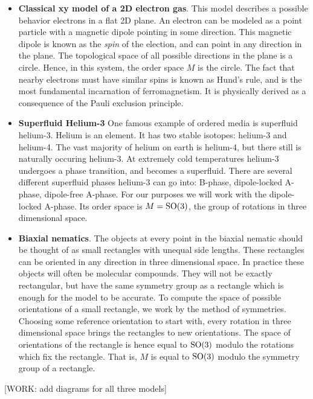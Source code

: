 \begin{itemize}
\item \textbf{Classical xy model of a 2D electron gas}. This model describes a possible behavior electrons in a flat 2D plane. An electron can be modeled as a point particle with a magnetic dipole pointing in some direction. This magnetic dipole is known as the \textit{spin} of the election, and can point in any direction in the plane. The topological space of all possible directions in the plane is a circle. Hence, in this system, the order space $M$ is the circle. The fact that nearby electrons must have similar spins is known as Hund’s rule, and is the most fundamental incarnation of ferromagnetism. It is physically derived as a consequence of the Pauli exclusion principle.

\item \textbf{Superfluid Helium-3} One famous example of ordered media is superfluid helium-3. Helium is an element. It has two stable isotopes: helium-3 and helium-4. The vast majority of helium on earth is helium-4, but there still is naturally occuring helium-3. At extremely cold temperatures helium-3 undergoes a phase transition, and becomes a superfluid. There are several different superfluid phases helium-3 can go into: B-phase, dipole-locked A-phase, dipole-free A-phase. For our purposes we will work with the dipole-locked A-phase. Its order space is $M=\operatorname{SO}(3)$, the group of rotations in three dimensional space.

\item \textbf{Biaxial nematics}. The objects at every point in the biaxial nematic should be thought of as small rectangles with unequal side lengths. These rectangles can be oriented in any direction in three dimensional space. In practice these objects will often be molecular compounds. They will not be exactly rectangular, but have the same symmetry group as a rectangle which is enough for the model to be accurate. To compute the space of possible orientations of a small rectangle, we work by the method of symmetries. Choosing some reference orientation to start with, every rotation in three dimensional space brings the rectangles to new orientations. The space of orientations of the rectangle is hence equal to $\operatorname{SO}(3)$ modulo the rotations which fix the rectangle. That is, $M$ is equal to $\operatorname{SO}(3)$ modulo the symmetry group of a rectangle.
\end{itemize}

[WORK: add diagrams for all three models]

